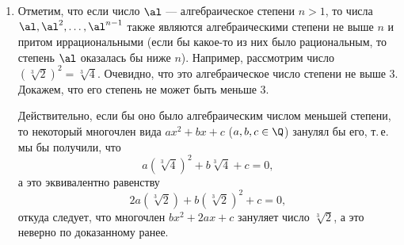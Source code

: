 \begin{enumerate}
\item Отметим, что если число $\al$ --- алгебраическое степени $n>1$, то числа $\al,\al^2,\dots,\al^{n-1}$ также являются алгебраическими степени не выше $n$ и притом иррациональными (если бы какое-то из них было рациональным, то степень $\al$ оказалась бы ниже $n$). Например, рассмотрим число $(\sqrt[3]{2})^2=\sqrt[3]{4}$.
Очевидно, что это алгебраическое число степени не выше 3. Докажем, что его степень не может быть меньше 3.

Действительно, если бы оно было алгебраическим числом меньшей степени, то некоторый многочлен вида $ax^2+bx+c$ ($a,b,c\in\Q$) занулял бы его, т.\,е. мы бы получили, что
$$
a(\sqrt[3]{4})^2 + b\sqrt[3]{4} + c=0,
$$
а это эквивалентно равенству
$$
2a(\sqrt[3]{2}) + b(\sqrt[3]{2})^2 + c=0,
$$
откуда следует, что многочлен $bx^2 + 2ax+c$ зануляет число $\sqrt[3]{2}$, а это неверно по доказанному ранее.


\end{enumerate}
